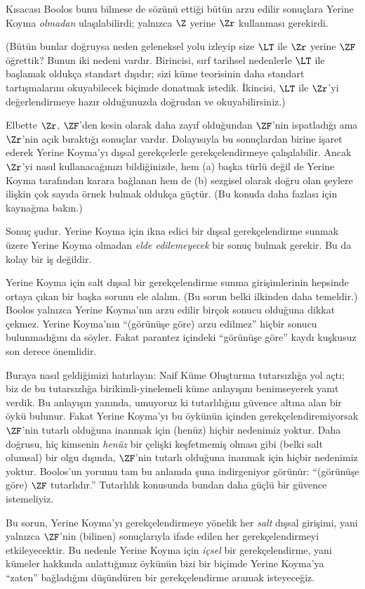\documentclass[../../../include/open-logic-section]{subfiles}
\begin{document}
Kısacası Boolos bunu bilmese de sözünü ettiği bütün arzu edilir sonuçlara
Yerine Koyma \emph{olmadan} ulaşılabilirdi; yalnızca $\Z$ yerine $\Zr$
kullanması gerekirdi.

(Bütün bunlar doğruysa neden geleneksel yolu izleyip size $\LT$ ile $\Zr$
yerine $\ZF$ öğrettik? Bunun iki nedeni vardır. Birincisi, sırf tarihsel
nedenlerle $\LT$ ile başlamak oldukça standart dışıdır; sizi küme teorisinin
daha standart tartışmalarını okuyabilecek biçimde donatmak istedik. İkincisi,
$\LT$ ile $\Zr$'yi değerlendirmeye hazır olduğunuzda doğrudan
\citealt{Potter2004} ve \citealt{ButtonLT1} okuyabilirsiniz.)

Elbette $\Zr$, $\ZF$'den kesin olarak daha zayıf olduğundan $\ZF$'nin
ispatladığı ama $\Zr$'nin açık bıraktığı sonuçlar vardır. Dolayısıyla bu
sonuçlardan birine işaret ederek Yerine Koyma'yı dışsal gerekçelerle
gerekçelendirmeye çalışılabilir. Ancak $\Zr$'yi nasıl kullanacağınızı
bildiğinizde, hem (a) başka türlü değil de Yerine Koyma tarafından karara
bağlanan hem de (b) sezgisel olarak doğru olan şeylere ilişkin çok sayıda
örnek bulmak oldukça güçtür. (Bu konuda daha fazlası için
\citealt[\S13.2]{Potter2004} kaynağına bakın.)

Sonuç şudur. Yerine Koyma için ikna edici bir dışsal gerekçelendirme sunmak
üzere Yerine Koyma olmadan \emph{elde edilemeyecek} bir sonuç bulmak
gerekir. Bu da kolay bir iş değildir.

Yerine Koyma için salt dışsal bir gerekçelendirme sunma girişimlerinin
hepsinde ortaya çıkan bir başka sorunu ele alalım. (Bu sorun belki ilkinden
daha temeldir.) Boolos yalnızca Yerine Koyma'nın arzu edilir birçok sonucu
olduğuna dikkat çekmez. Yerine Koyma'nın ``(görünüşe göre) arzu edilmez''
hiçbir sonucu bulunmadığını da söyler. Fakat parantez içindeki ``görünüşe
göre'' kaydı kuşkusuz son derece önemlidir.

Buraya nasıl geldiğimizi hatırlayın: Naif Küme Oluşturma tutarsızlığa yol
açtı; biz de bu tutarsızlığa birikimli-yinelemeli küme anlayışını benimseyerek
yanıt verdik. Bu anlayışın yanında, umuyoruz ki tutarlılığını güvence altına
alan bir öykü bulunur. Fakat Yerine Koyma'yı bu öykünün içinden
gerekçelendiremiyorsak $\ZF$'nin tutarlı olduğuna inanmak için (henüz) hiçbir
nedenimiz yoktur. Daha doğrusu, hiç kimsenin \emph{henüz} bir çelişki
keşfetmemiş olması gibi (belki salt olumsal) bir olgu dışında, $\ZF$'nin
tutarlı olduğuna inanmak için hiçbir nedenimiz yoktur. Boolos'un yorumu tam
bu anlamda şuna indirgeniyor görünür: ``(görünüşe göre) $\ZF$ tutarlıdır.''
Tutarlılık konusunda bundan daha güçlü bir güvence istemeliyiz.

Bu sorun, Yerine Koyma'yı gerekçelendirmeye yönelik her \emph{salt} dışsal
girişimi, yani yalnızca $\ZF$'nin (bilinen) sonuçlarıyla ifade edilen her
gerekçelendirmeyi etkileyecektir. Bu nedenle Yerine Koyma için \emph{içsel}
bir gerekçelendirme, yani kümeler hakkında anlattığımız öykünün bizi bir
biçimde Yerine Koyma'ya ``zaten'' bağladığını düşündüren bir gerekçelendirme
aramak isteyeceğiz.
\end{document}
